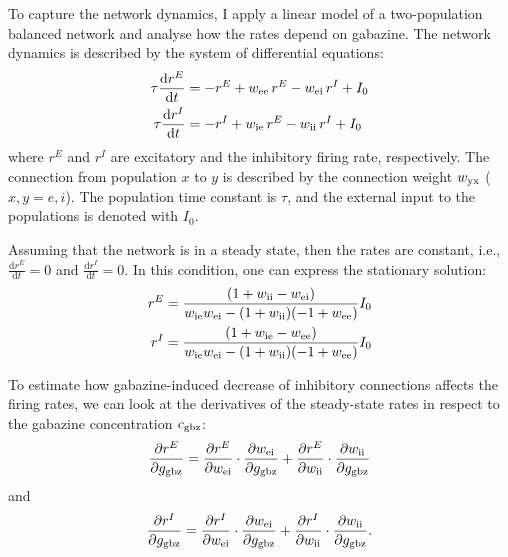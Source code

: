     To capture the network dynamics, I apply a linear model of a two-population
    balanced network and analyse how the rates depend on gabazine. The network
    dynamics is described by the system of differential equations:
    \begin{equation}
      \begin{split}
        \tau \frac{\text{d}r^E}{\text{d}t} &= - r^E + w_{\rm ee} \, r^E -w_{\rm ei} \, r^I + I_0\\
        \tau \frac{\text{d}r^I}{\text{d}t} &= - r^I + w_{\rm ie} \, r^E -w_{\rm ii} \, r^I + I_0\\
      \end{split}
      \label{eq:balanced_net}
    \end{equation}
    where $r^E$ and $r^I$ are excitatory and the inhibitory firing rate,
    respectively. The connection from population $x$ to $y$ is described by the
    connection weight $w_{\rm yx}$ ($x,y = e, i$). The population time constant
    is $\tau$, and the external input to the populations is denoted with $I_0$.

    Assuming that the network is in a steady state, then the rates are
    constant, i.e., $ \frac{\text{d}r^E}{\text{d}t} = 0$ and
    $\frac{\text{d}r^I}{\text{d}t} = 0 $. In this condition, one can express
    the stationary solution:
    \begin{equation}
      \begin{split}
        r^E &= \frac{(1+w_{\rm ii} - w_{\rm ei})}{w_{\rm ie}w_{\rm ei} -
                (1+w_{\rm ii})(-1+w_{\rm ee})} I_0 \\
        r^I &= \frac{(1+w_{\rm ie} - w_{\rm ee})}{w_{\rm ie}w_{\rm ei} -
                (1+w_{\rm ii})(-1+w_{\rm ee})} I_0
      \end{split}
      \label{eq:balanced_sol}
    \end{equation}
  
    To estimate how gabazine-induced decrease of inhibitory connections
    affects the firing rates, we can look at the derivatives of the
    steady-state rates in respect to the gabazine concentration $c_{\rm gbz}$:
    \begin{equation}
      \frac{\partial r^E}{\partial g_{\rm gbz}} =
      \frac{\partial r^E}{\partial w_{\rm ei}} \cdot \frac{\partial w_{\rm ei}}{\partial g_{\rm gbz}} + 
      \frac{\partial r^E}{\partial w_{\rm ii}} \cdot \frac{\partial w_{\rm ii}}{\partial g_{\rm gbz}}
      \label{eq:re_chain}
    \end{equation}
    and
    \begin{equation}
      \frac{\partial r^I}{\partial g_{\rm gbz}} =
      \frac{\partial r^I}{\partial w_{\rm ei}} \cdot \frac{\partial w_{\rm ei}}{\partial g_{\rm gbz}} + 
      \frac{\partial r^I}{\partial w_{\rm ii}} \cdot \frac{\partial w_{\rm ii}}{\partial g_{\rm gbz}}.
      \label{eq:ri_chain}
    \end{equation}

